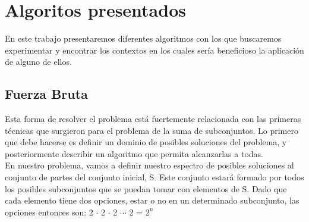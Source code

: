 \documentclass[7pt,a4paper]{article}
\begin{document}
\begin{verse}

\end{verse}
\section{Algoritos presentados}
En este trabajo presentaremos diferentes algoritmos con los que buscaremos experimentar y encontrar los contextos en los cuales sería beneficioso la aplicación de alguno de ellos.
\subsection{Fuerza Bruta}
Esta forma de resolver el problema está fuertemente relacionada con las primeras técnicas que surgieron para el problema de la suma de subconjuntos. Lo primero que debe hacerse es definir un dominio de posibles soluciones del problema, y posteriormente describir un algoritmo que permita alcanzarlas a todas. \\

	En nuestro problema, vamos a definir nuestro espectro de posibles soluciones al conjunto de partes del conjunto inicial, S. Este conjunto estará formado por todos los posibles subconjuntos que se puedan tomar con elementos de S. Dado que cada elemento tiene dos opciones, estar o no en un determinado subconjunto, las opciones entonces son: 2 $\cdot$ 2 $\cdot$ 2  $\cdots$ 2 = $2^{n}$
\end{document}
